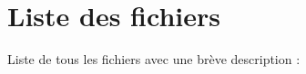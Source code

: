\section{Liste des fichiers}
Liste de tous les fichiers avec une brève description \-:\begin{DoxyCompactList}
\item{}
\item{}
\end{DoxyCompactList}
